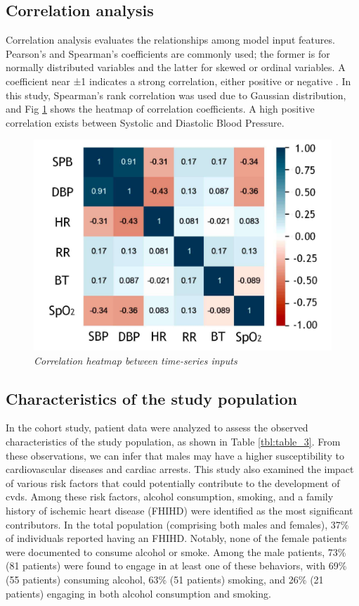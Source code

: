 \documentclass[journal,article,submit,pdftex,moreauthors]{Definitions/mdpi}
\begin{document}
\subsection{Correlation analysis}

Correlation analysis evaluates the relationships among model input features. Pearson's and Spearman's coefficients are commonly used; the former is for normally distributed variables and the latter for skewed or ordinal variables. A coefficient near ±1 indicates a strong correlation, either positive or negative \cite{b25}. In this study, Spearman's rank correlation was used due to Gaussian distribution, and Fig \ref{fig:figure8} shows the heatmap of correlation coefficients. A high positive correlation exists between Systolic and Diastolic Blood Pressure.

\begin{figure}[hbt!]
    \centering
    \includegraphics[width=0.75\linewidth]{images/correlations.pdf}
    \caption{\textit{Correlation heatmap between time-series inputs}}
    \label{fig:figure8}
    \vspace{-10pt}
\end{figure}

\subsection{Characteristics of the study population}

In the cohort study, patient data were analyzed to assess the observed characteristics of the study population, as shown in Table \ref{tbl:table_3}. From these observations, we can infer that males may have a higher susceptibility to cardiovascular diseases and cardiac arrests. This study also examined the impact of various risk factors that could potentially contribute to the development of \glspl{cvd}. Among these risk factors, alcohol consumption, smoking, and a family history of ischemic heart disease (FHIHD) were identified as the most significant contributors. In the total population (comprising both males and females), 37\% of individuals reported having an FHIHD. Notably, none of the female patients were documented to consume alcohol or smoke. Among the male patients, 73\% (81 patients) were found to engage in at least one of these behaviors, with 69\% (55 patients) consuming alcohol, 63\% (51 patients) smoking, and 26\% (21 patients) engaging in both alcohol consumption and smoking.
\end{document}
